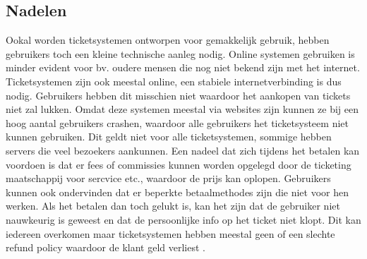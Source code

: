\subsection{Nadelen}
Ookal worden ticketsystemen ontworpen voor gemakkelijk gebruik, hebben gebruikers toch een kleine technische aanleg nodig. Online systemen gebruiken is minder evident voor bv. oudere mensen die nog niet bekend zijn met het internet.
Ticketsystemen zijn ook meestal online, een stabiele internetverbinding is dus nodig. Gebruikers hebben dit misschien niet waardoor het aankopen van tickets niet zal lukken. 
Omdat deze systemen meestal via websites zijn kunnen ze bij een hoog aantal gebruikers crashen, waardoor alle gebruikers het ticketsysteem niet kunnen gebruiken. Dit geldt niet voor alle ticketsystemen, sommige hebben servers die veel bezoekers aankunnen.
Een nadeel dat zich tijdens het betalen kan voordoen is dat er fees of commissies kunnen worden opgelegd door de ticketing maatschappij voor sercvice etc., waardoor de prijs kan oplopen. Gebruikers kunnen ook ondervinden dat er beperkte betaalmethodes zijn die niet voor hen werken. 
Als het betalen dan toch gelukt is, kan het zijn dat de gebruiker niet nauwkeurig is geweest en dat de persoonlijke info op het ticket niet klopt.
Dit kan iedereen overkomen maar ticketsystemen hebben meestal geen of een slechte refund policy waardoor de klant geld verliest \cite{concert-tickets-online2021}. 

